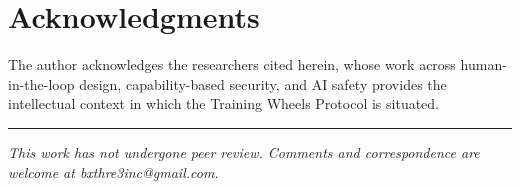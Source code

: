 \documentclass[12pt]{article}
\begin{document}
\section*{Acknowledgments}

The author acknowledges the researchers cited herein, whose work across human-in-the-loop design, capability-based security, and AI safety provides the intellectual context in which the Training Wheels Protocol is situated.




\vspace{2em}
\hrule
\vspace{0.5em}
\noindent\small\textit{This work has not undergone peer review. Comments and correspondence are welcome at bxthre3inc@gmail.com.}
\end{document}
